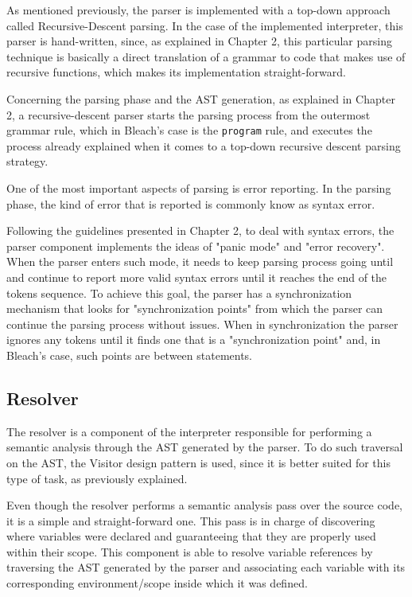 As mentioned previously, the parser is implemented with a top-down approach called Recursive-Descent parsing. In the case of the implemented interpreter, this parser is hand-written, since, as explained in Chapter 2, this particular parsing technique is basically a direct translation of a grammar to code that makes use of recursive functions, which makes its implementation straight-forward.

Concerning the parsing phase and the AST generation, as explained in Chapter 2, a recursive-descent parser starts the parsing process from the outermost grammar rule, which in Bleach's case is the \texttt{program} rule, and executes the process already explained when it comes to a top-down recursive descent parsing strategy.

One of the most important aspects of parsing is error reporting. In the parsing phase, the kind of error that is reported is commonly know as syntax error.

Following the guidelines presented in Chapter 2, to deal with syntax errors, the parser component implements the ideas of "panic mode" and "error recovery". When the parser enters such mode, it needs to keep parsing process going until and continue to report more valid syntax errors until it reaches the end of the tokens sequence. To achieve this goal, the parser has a synchronization mechanism that looks for "synchronization points" from which the parser can continue the parsing process without issues. When in synchronization the parser ignores any tokens until it finds one that is a "synchronization point" and, in Bleach's case, such points are between statements.

\subsection{Resolver}
The resolver is a component of the interpreter responsible for performing a semantic analysis through the AST generated by the parser. To do such traversal on the AST, the Visitor design pattern is used, since it is better suited for this type of task, as previously explained. 

Even though the resolver performs a semantic analysis pass over the source code, it is a simple and straight-forward one. This pass is in charge of discovering where variables were declared and guaranteeing that they are properly used within their scope. This component is able to resolve variable references by traversing the AST generated by the parser and associating each variable with its corresponding environment/scope inside which it was defined.

